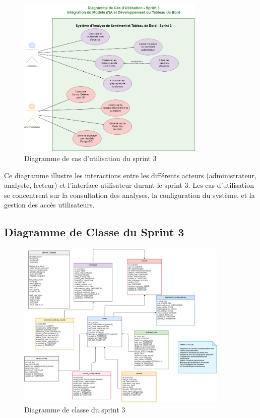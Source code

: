 \begin{figure}[H]
\centering
\includegraphics[width=0.8\textwidth]{assets/images/sprint3-usecase.png}
\caption{Diagramme de cas d'utilisation du sprint 3}
\label{fig:sprint3-usecase}
\end{figure}

Ce diagramme illustre les interactions entre les différents acteurs (administrateur, analyste, lecteur) et l'interface utilisateur durant le sprint 3. Les cas d'utilisation se concentrent sur la consultation des analyses, la configuration du système, et la gestion des accès utilisateurs.

\subsection{Diagramme de Classe du Sprint 3}

\begin{figure}[H]
\centering
\includegraphics[width=0.9\textwidth]{assets/images/sprint3-class.png}
\caption{Diagramme de classe du sprint 3}
\label{fig:sprint3-class}
\end{figure}

